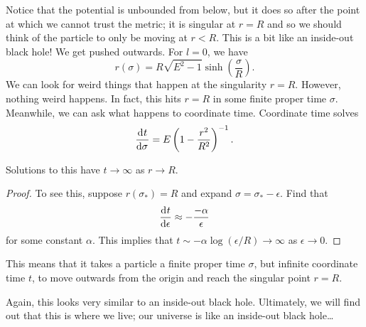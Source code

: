 Notice that the potential is unbounded from below, but it does so after the point at which we cannot trust the metric; it is singular at $r = R$ and so we should think of the particle to only be moving at $r < R$.
This is a bit like an inside-out black hole! We get pushed outwards.
For $l = 0$, we have
\begin{equation}
  r(\sigma) = R \sqrt{E^2 - 1} \sinh (\frac{\sigma}{R}).
\end{equation}
We can look for weird things that happen at the singularity $r = R$. However, nothing weird happens. In fact, this hits $r = R$ in some finite proper time $\sigma$. 
Meanwhile, we can ask what happens to coordinate time.
Coordinate time solves
\begin{equation}
  \dv[]{t}{\sigma} = E \left( 1 - \frac{r^2}{R^2} \right)^{-1}.
\end{equation}
\begin{claim}
  Solutions to this have $t \to \infty$ as $r \to R$.
\end{claim}
\begin{proof}
  To see this, suppose $r(\sigma_*) = R$ and expand $\sigma = \sigma_* - \epsilon$. Find that
  \begin{equation}
    \dv[]{t}{\epsilon} \approx - \frac{-\alpha}{\epsilon}
  \end{equation}
  for some constant $\alpha$.
  This implies that $t \sim -\alpha \log(\epsilon / R) \to \infty$ as $\epsilon \to 0$.
\end{proof}
This means that it takes a particle a finite proper time $\sigma$, but infinite coordinate time $t$, to move outwards from the origin and reach the singular point $r = R$.
\begin{leftbar}
  \begin{remark}
    Again, this looks very similar to an inside-out black hole.
    Ultimately, we will find out that this is where we live; our universe is like an inside-out black hole\dots
  \end{remark}
\end{leftbar}
